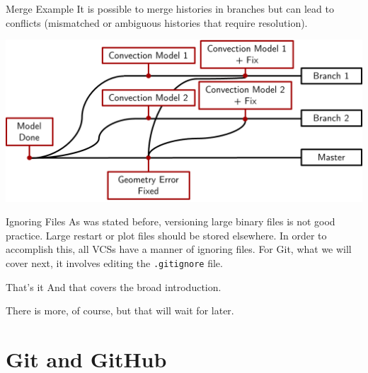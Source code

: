 \documentclass[10pt,t,xcolor=table]{UWMadBeamer}
\begin{document}
    \begin{frame}[c]{Merge Example}
        It is possible to {merge} histories in branches but can lead to { conflicts} (mismatched or ambiguous histories that require resolution).
        
        {
            \centering
            \includegraphics[scale=0.50]{MergeExample}
        }
    \end{frame}

    \begin{frame}{Ignoring Files}
        As was stated before, versioning large binary files is not good practice.
        Large restart or plot files should be stored elsewhere.
        \vfill
        In order to accomplish this, all VCSs have a manner of ignoring files.
        \vfill
        For Git, what we will cover next, it involves editing the \texttt{.gitignore} file.
    \end{frame}

    \begin{frame}{That's it}
        And that covers the broad introduction.
        
        There is more, of course, but that will wait for later.
    \end{frame}



\section{Git and GitHub}
\end{document}
